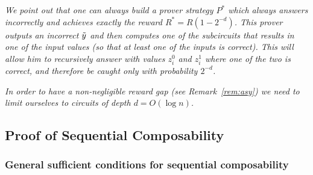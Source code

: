 \begin{myrem}
\label{rem:match}
{\em 
We point out that one can always build a prover strategy 
$P^*$ which always answers incorrectly and achieves exactly the reward 
$R^*=R(1-2^{-d})$. This prover outputs an incorrect 
$\tilde{y}$ and then computes one of the subcircuits that results in one of the input values (so that at least one of the inputs is correct). This will allow him to recursively answer with values $z^0_i$ and $z^1_i$ where one of the two is correct, and therefore be caught only with probability $2^{-d}$.
}
\end{myrem}

\begin{myrem}
\label{rem:logd}
{\em 
In order to have a non-negligible reward gap (see Remark~\ref{rem:asy}) we need
to limit ourselves to circuits of depth $d=O(\log n)$. 
}
\end{myrem}

\subsection{Proof of Sequential Composability}
\label{sec:proof-comp}

\subsubsection{General sufficient conditions for sequential composability}

